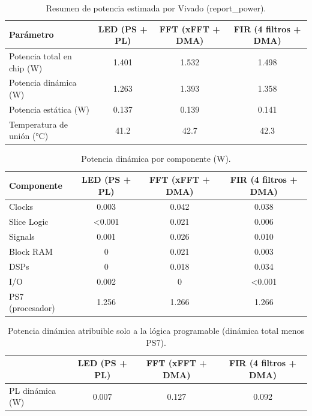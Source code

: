 \begin{table}[H]\centering\caption{Resumen de potencia estimada por Vivado (report\_power).}\label{tab:pot_resumen}
\begin{tabular}{lccc}\toprule
Parámetro & LED (PS + PL) & FFT (xFFT + DMA) & FIR (4 filtros + DMA)\\\midrule
Potencia total en chip (W) & 1.401 & 1.532 & 1.498\\
Potencia dinámica (W) & 1.263 & 1.393 & 1.358\\
Potencia estática (W) & 0.137 & 0.139 & 0.141\\
Temperatura de unión (°C) & 41.2 & 42.7 & 42.3\\
\bottomrule\end{tabular}\end{table}
\begin{table}[H]\centering\caption{Potencia dinámica por componente (W).}\label{tab:pot_comp}
\begin{tabular}{lccc}\toprule
Componente & LED (PS + PL) & FFT (xFFT + DMA) & FIR (4 filtros + DMA)\\\midrule
Clocks & 0.003 & 0.042 & 0.038\\
Slice Logic & <0.001 & 0.021 & 0.006\\
Signals & 0.001 & 0.026 & 0.010\\
Block RAM & 0 & 0.021 & 0.003\\
DSPs & 0 & 0.018 & 0.034\\
I/O & 0.002 & 0 & <0.001\\
PS7 (procesador) & 1.256 & 1.266 & 1.266\\
\bottomrule\end{tabular}\end{table}
\begin{table}[H]\centering\caption{Potencia dinámica atribuible solo a la lógica programable (dinámica total menos PS7).}\label{tab:pot_pl}
\begin{tabular}{lccc}\toprule
 & LED (PS + PL) & FFT (xFFT + DMA) & FIR (4 filtros + DMA)\\\midrule
PL dinámica (W) & 0.007 & 0.127 & 0.092\\
\bottomrule\end{tabular}\end{table}
